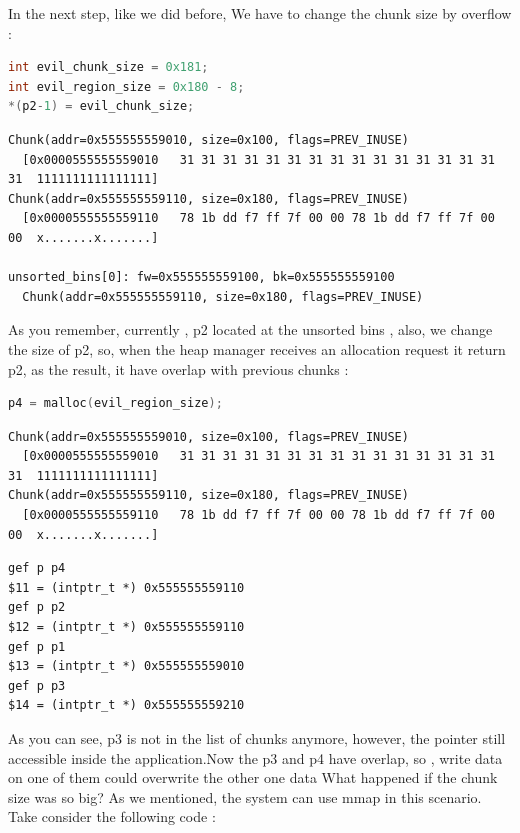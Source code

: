 \documentclass{masterthesis}
\newcommand*\ub{unsorted bins}
\begin{document}
In the next step, like we did before, We have to change the chunk size by overflow :

\begin{lstlisting}[language=c,frame=tlrb]
int evil_chunk_size = 0x181;
int evil_region_size = 0x180 - 8;
*(p2-1) = evil_chunk_size;
\end{lstlisting}

\begin{lstlisting}[frame=tlrb]
Chunk(addr=0x555555559010, size=0x100, flags=PREV_INUSE)
  [0x0000555555559010   31 31 31 31 31 31 31 31 31 31 31 31 31 31 31 31  1111111111111111]
Chunk(addr=0x555555559110, size=0x180, flags=PREV_INUSE)
  [0x0000555555559110   78 1b dd f7 ff 7f 00 00 78 1b dd f7 ff 7f 00 00  x.......x.......]

unsorted_bins[0]: fw=0x555555559100, bk=0x555555559100
  Chunk(addr=0x555555559110, size=0x180, flags=PREV_INUSE)
 \end{lstlisting}
 
As you remember, currently , p2 located at the \ub{} , also, we change the size of p2, so, when the heap manager receives an allocation request it return p2, as the result, it have overlap with previous chunks :

\begin{lstlisting}[language=c,frame=tlrb]
p4 = malloc(evil_region_size);
 \end{lstlisting}

\begin{lstlisting}[frame=tlrb]
Chunk(addr=0x555555559010, size=0x100, flags=PREV_INUSE)
  [0x0000555555559010   31 31 31 31 31 31 31 31 31 31 31 31 31 31 31 31  1111111111111111]
Chunk(addr=0x555555559110, size=0x180, flags=PREV_INUSE)
  [0x0000555555559110   78 1b dd f7 ff 7f 00 00 78 1b dd f7 ff 7f 00 00  x.......x.......]
\end{lstlisting}

\begin{lstlisting}[frame=tlrb]   
gef p p4
$11 = (intptr_t *) 0x555555559110
gef p p2
$12 = (intptr_t *) 0x555555559110
gef p p1
$13 = (intptr_t *) 0x555555559010
gef p p3
$14 = (intptr_t *) 0x555555559210
\end{lstlisting}
  
As you can see, p3 is not in the list of chunks anymore, however, the pointer still accessible inside the application.Now the p3 and p4 have overlap, so , write data on one of them could overwrite the other one data
What happened if the chunk size was so big? As we mentioned, the system can use mmap in this scenario. Take consider the following code : 
\end{document}
